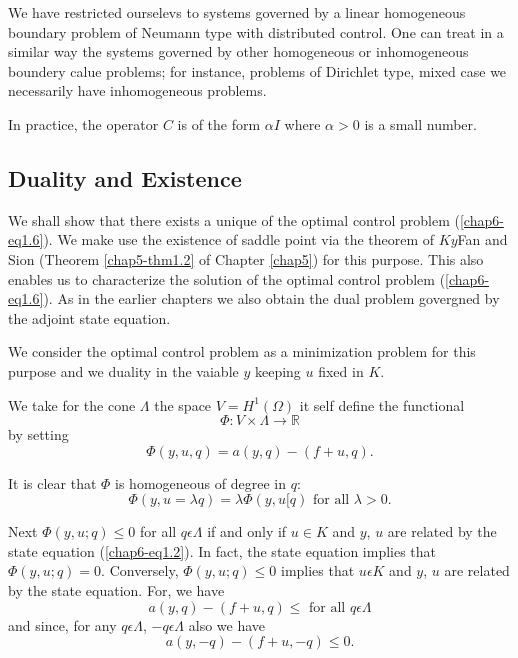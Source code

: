 \begin{remark}\label{chap6-rem1.4}
We have restricted ourselevs to systems governed by a linear
homogeneous boundary problem of Neumann type with distributed
control. One can treat in a similar way the systems governed  by other
homogeneous or inhomogeneous boundery calue problems; for instance,
problems of Dirichlet type, mixed case we necessarily have
inhomogeneous problems. 
\end{remark}

\begin{remark}\label{chap6-rem1.5}
In practice, the operator $C$ is of the form $\alpha I$ where $\alpha > 0$ is a small number.
\end{remark}

\subsection{Duality and Existence}\label{chap6-subsec1.2}

We shall show that there exists a unique of the optimal control
problem (\ref{chap6-eq1.6}). We make use the existence of saddle point
via the theorem of $Ky$\pageoriginale Fan and Sion (Theorem
\ref{chap5-thm1.2} of Chapter \ref{chap5}) for this purpose. This also
enables us to characterize the solution of the optimal control problem
(\ref{chap6-eq1.6}). As in the earlier chapters we also obtain the
dual problem govergned by the adjoint state equation. 

We consider the optimal control problem as a minimization problem for
this purpose and we duality in the vaiable $y$ keeping $u$ fixed in
$K$. 

We take for the cone $\Lambda$ the space $V = H^{1} (\Omega)$ it self define the functional 
\begin{equation*}
\Phi : V \times \Lambda \to \mathbb{R}\tag{1.7}\label{chap6-eq1}
\end{equation*}
by setting
\begin{equation*}
\Phi (y, u, q) = a(y, q) - (f + u, q).\tag*{$(1.7)'$}
\end{equation*}

It is clear that $\Phi$ is homogeneous of degree in $q$:
$$
\Phi (y, u = \lambda q) = \lambda  \Phi (y, u [ q) \text{ for all } \lambda > 0.
$$

Next $\Phi (y, u ; q) \leq 0$ for all $q \epsilon \Lambda$ if and only
if $u \in K$ and $y$, $u$ are related by the state equation
(\ref{chap6-eq1.2}). In fact, the state equation implies that $\Phi
(y, u ; q) = 0$. Conversely, $\Phi (y, u ; q) \leq 0$ implies that $u
\epsilon K$ and $y$, $u$ are related by the state equation. For, we
have 
$$
a(y, q) - (f + u, q) \leq \text{ for all } q \epsilon \Lambda
$$ 
and since, for any $q \epsilon \Lambda$, $-q \epsilon \Lambda$ also we have
$$
a(y, -q) - (f+u, -q) \leq 0.
$$

